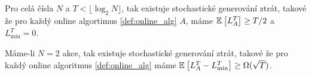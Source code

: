 \begin{theorem}
\label{thm:prop1} 
Pro celá čísla $N$ a $T < \lfloor \log_2 N\rfloor$, tak existuje stochastické generování ztrát, takové že pro každý online algortimus \ref{def:online_alg} $A$, máme $\mathbb{E}_{}\left[L_A^T\right] \geq T/2$ a $L_{\min}^T = 0$.
\end{theorem}
\begin{theorem}
\label{thm:prop2}
Máme-li $N=2$ akce, tak existuje stochastické generování ztrát, takové že pro každý online algoritmus \ref{def:online_alg} máme $\mathbb{E}_{}\left[L_A^T - L^T_{\min}\right] \geq \Omega (\sqrt{T})$.
\end{theorem}
